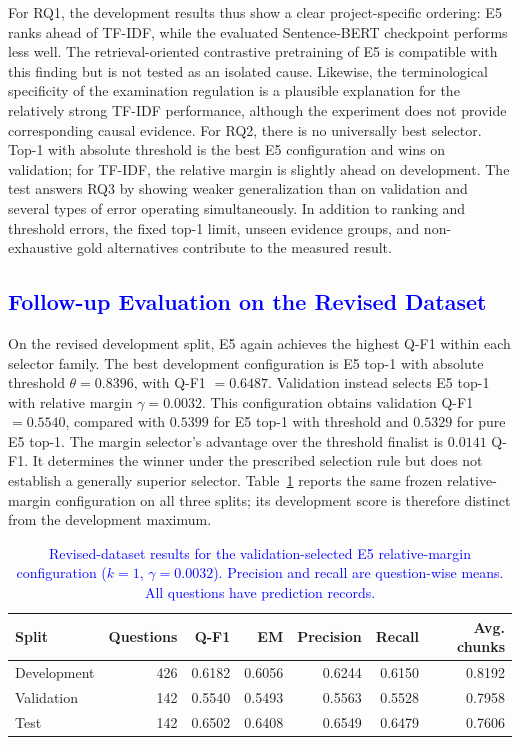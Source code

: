 \documentclass[11pt]{article}
\newcommand{\revision}[1]{{\color{blue}#1}}
\begin{document}
For RQ1, the development results thus show a clear project-specific ordering: E5 ranks ahead of TF-IDF, while the evaluated Sentence-BERT checkpoint performs less well. The retrieval-oriented contrastive pretraining of E5 is compatible with this finding but is not tested as an isolated cause. Likewise, the terminological specificity of the examination regulation is a plausible explanation for the relatively strong TF-IDF performance, although the experiment does not provide corresponding causal evidence. For RQ2, there is no universally best selector. Top-1 with absolute threshold is the best E5 configuration and wins on validation; for TF-IDF, the relative margin is slightly ahead on development. The test answers RQ3 by showing weaker generalization than on validation and several types of error operating simultaneously. In addition to ranking and threshold errors, the fixed top-1 limit, unseen evidence groups, and non-exhaustive gold alternatives contribute to the measured result.


\subsection{\textcolor{blue}{Follow-up Evaluation on the Revised Dataset}}
\label{sec:follow-up}

\revision{On the revised development split, E5 again achieves the highest Q-F1 within each selector family. The best development configuration is E5 top-1 with absolute threshold $\theta=0.8396$, with Q-F1 $=0.6487$. Validation instead selects E5 top-1 with relative margin $\gamma=0.0032$. This configuration obtains validation Q-F1 $=0.5540$, compared with $0.5399$ for E5 top-1 with threshold and $0.5329$ for pure E5 top-1. The margin selector's advantage over the threshold finalist is $0.0141$ Q-F1. It determines the winner under the prescribed selection rule but does not establish a generally superior selector. Table~\ref{tab:follow-up} reports the same frozen relative-margin configuration on all three splits; its development score is therefore distinct from the development maximum.}

\begin{table}[t]
\centering
\color{blue}
\small
\begin{tabular}{lrrrrrr}
\toprule
\textbf{Split} & \textbf{Questions} & \textbf{Q-F1} & \textbf{EM} & \textbf{Precision} & \textbf{Recall} & \textbf{Avg. chunks} \\
\midrule
Development & 426 & 0.6182 & 0.6056 & 0.6244 & 0.6150 & 0.8192 \\
Validation & 142 & 0.5540 & 0.5493 & 0.5563 & 0.5528 & 0.7958 \\
Test & 142 & 0.6502 & 0.6408 & 0.6549 & 0.6479 & 0.7606 \\
\bottomrule
\end{tabular}
\caption{\textcolor{blue}{Revised-dataset results for the validation-selected E5 relative-margin configuration ($k=1$, $\gamma=0.0032$). Precision and recall are question-wise means. All questions have prediction records.}}
\label{tab:follow-up}
\end{table}
\end{document}
